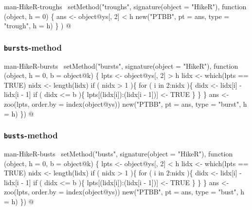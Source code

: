 \documentclass[a4paper]{article}
\begin{document}
\nwenddocs{}\endmoddef
\LA{}man-HikeR-troughs~{\nwtagstyle{}}\RA{}
setMethod("troughs",
    signature(object = "HikeR"),
    function (object, h = 0) \{
        ans <- object@ys[, 2] < h
        new("PTBB", pt = ans, type = "trough", h = h)
    \}
)
\nwendcode{}@

\subsubsection{\texttt{bursts}-method}

\nwenddocs{}\endmoddef
\LA{}man-HikeR-bursts~{\nwtagstyle{}}\RA{}
setMethod("bursts",
    signature(object = "HikeR"),
    function (object, h = 0, b = object@k) \{
        lpts <- object@ys[, 2] > h
        lidx <- which(lpts == TRUE)
        nidx <- length(lidx)
        if ( nidx > 1 )\{
            for ( i in 2:nidx )\{
                didx <- lidx[i] - lidx[i - 1]
                if ( didx <= b )\{
                    lpts[(lidx[i]):(lidx[i - 1])] <- TRUE
                \}
            \}
        \}
        ans <- zoo(lpts, order.by = index(object@ys))
        new("PTBB", pt = ans, type = "burst", h = h)
\})
\nwendcode{}@

\subsubsection{\texttt{busts}-method}

\nwenddocs{}\endmoddef
\LA{}man-HikeR-busts~{\nwtagstyle{}}\RA{}
setMethod("busts",
    signature(object = "HikeR"),
    function (object, h = 0, b = object@k) \{
        lpts <- object@ys[, 2] < h
        lidx <- which(lpts == TRUE)
        nidx <- length(lidx)
        if ( nidx > 1 )\{
            for ( i in 2:nidx )\{
                didx <- lidx[i] - lidx[i - 1]
                if ( didx <= b )\{
                    lpts[(lidx[i]):(lidx[i - 1])] <- TRUE
                \}
            \}
        \}
        ans <- zoo(lpts, order.by = index(object@ys))
        new("PTBB", pt = ans, type = "bust", h = h)
\})
\nwendcode{}@
\end{document}
